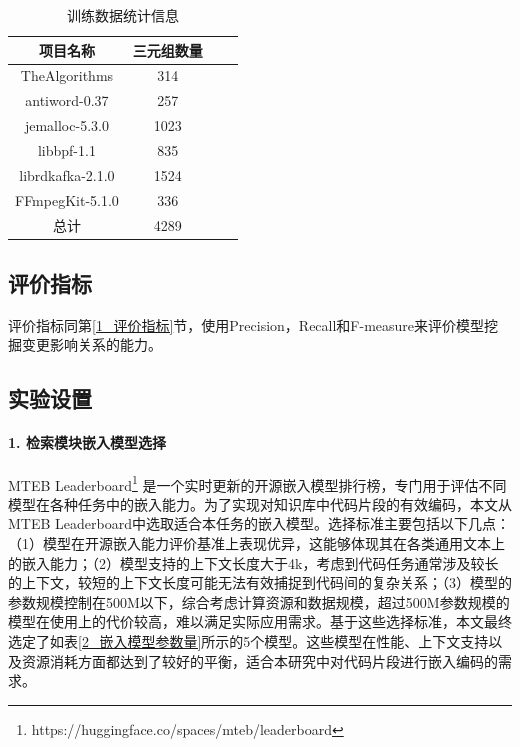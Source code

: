 \begin{table}[htbp]
\caption{训练数据统计信息}
\label{1_数据集统计信息}
\vspace{0.5em}\centering\wuhao
\begin{tabular}{cccc}
\toprule
项目名称 & 三元组数量 \\
\midrule
TheAlgorithms    & 314   \\
antiword-0.37    & 257   \\
jemalloc-5.3.0   & 1023   \\
libbpf-1.1       & 835   \\
librdkafka-2.1.0 & 1524  \\
FFmpegKit-5.1.0  & 336   \\ 
总计              & 4289  \\
\bottomrule
\end{tabular}
\end{table}

\subsection{评价指标} 
评价指标同第\ref{1_评价指标}节，使用Precision，Recall和F-measure来评价模型挖掘变更影响关系的能力。

\subsection{实验设置}

\paragraph{1. 检索模块嵌入模型选择}
MTEB Leaderboard\footnote{https://huggingface.co/spaces/mteb/leaderboard} 是一个实时更新的开源嵌入模型排行榜，专门用于评估不同模型在各种任务中的嵌入能力。为了实现对知识库中代码片段的有效编码，本文从MTEB Leaderboard中选取适合本任务的嵌入模型。选择标准主要包括以下几点：（1）模型在开源嵌入能力评价基准上表现优异，这能够体现其在各类通用文本上的嵌入能力；（2）模型支持的上下文长度大于4k，考虑到代码任务通常涉及较长的上下文，较短的上下文长度可能无法有效捕捉到代码间的复杂关系；（3）模型的参数规模控制在500M以下，综合考虑计算资源和数据规模，超过500M参数规模的模型在使用上的代价较高，难以满足实际应用需求。基于这些选择标准，本文最终选定了如表\ref{2_嵌入模型参数量}所示的5个模型。这些模型在性能、上下文支持以及资源消耗方面都达到了较好的平衡，适合本研究中对代码片段进行嵌入编码的需求。
    
